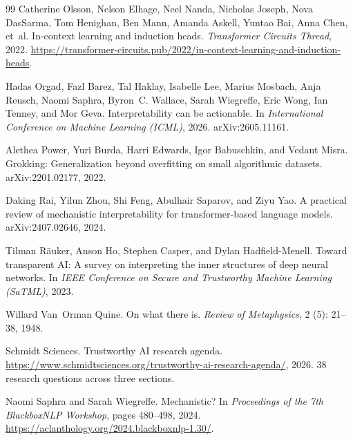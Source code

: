 \documentclass{article}
\begin{document}
\begin{thebibliography}{99}
Catherine Olsson, Nelson Elhage, Neel Nanda, Nicholas Joseph, Nova DasSarma,
  Tom Henighan, Ben Mann, Amanda Askell, Yuntao Bai, Anna Chen, et~al.
\newblock In-context learning and induction heads.
\newblock \emph{Transformer Circuits Thread}, 2022.
\newblock \url{https://transformer-circuits.pub/2022/in-context-learning-and-induction-heads}.

Hadas Orgad, Fazl Barez, Tal Haklay, Isabelle Lee, Marius Mosbach, Anja Reusch,
  Naomi Saphra, Byron~C. Wallace, Sarah Wiegreffe, Eric Wong, Ian Tenney, and
  Mor Geva.
\newblock Interpretability can be actionable.
\newblock In \emph{International Conference on Machine Learning (ICML)}, 2026.
\newblock arXiv:2605.11161.

Alethea Power, Yuri Burda, Harri Edwards, Igor Babuschkin, and Vedant Misra.
\newblock Grokking: Generalization beyond overfitting on small algorithmic
  datasets.
\newblock arXiv:2201.02177, 2022.

Daking Rai, Yilun Zhou, Shi Feng, Abulhair Saparov, and Ziyu Yao.
\newblock A practical review of mechanistic interpretability for
  transformer-based language models.
\newblock arXiv:2407.02646, 2024.

Tilman R\"auker, Anson Ho, Stephen Casper, and Dylan Hadfield-Menell.
\newblock Toward transparent {AI}: A survey on interpreting the inner
  structures of deep neural networks.
\newblock In \emph{IEEE Conference on Secure and Trustworthy Machine Learning
  (SaTML)}, 2023.

Willard Van~Orman Quine.
\newblock On what there is.
\newblock \emph{Review of Metaphysics}, 2 (5): 21--38, 1948.

Schmidt Sciences.
\newblock Trustworthy {AI} research agenda.
\newblock \url{https://www.schmidtsciences.org/trustworthy-ai-research-agenda/},
  2026.  38 research questions across three sections.

Naomi Saphra and Sarah Wiegreffe.
\newblock Mechanistic?
\newblock In \emph{Proceedings of the 7th BlackboxNLP Workshop}, pages
  480--498, 2024.
\newblock \url{https://aclanthology.org/2024.blackboxnlp-1.30/}.


\end{thebibliography}
\end{document}
